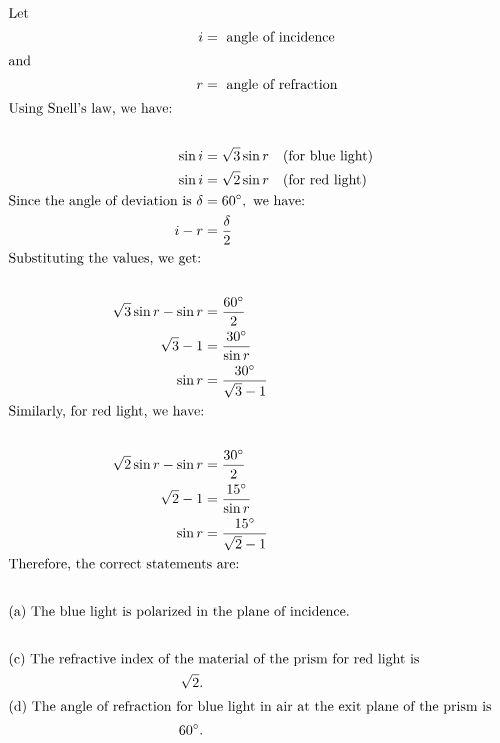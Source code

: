 \begin{solution}
        \begin{align*}
            \intertext{Let } i &= \text{ angle of incidence} \\
            \intertext{and } r &= \text{ angle of refraction} \\
            \intertext{Using Snell's law, we have:} \\
            \sin i &= \sqrt{3} \sin r \quad \text{(for blue light)} \\
            \sin i &= \sqrt{2} \sin r \quad \text{(for red light)} \\
            \text{Since the angle of deviation is } \delta &= 60^\circ, \text{ we have:} \\
            i - r &= \frac{\delta}{2} \\
            \intertext{Substituting the values, we get:} \\
            \sqrt{3} \sin r - \sin r &= \frac{60^\circ}{2} \\
            \sqrt{3} - 1 &= \frac{30^\circ}{\sin r} \\
            \sin r &= \frac{30^\circ}{\sqrt{3} - 1} \\
            \intertext{Similarly, for red light, we have:} \\
            \sqrt{2} \sin r - \sin r &= \frac{30^\circ}{2} \\
            \sqrt{2} - 1 &= \frac{15^\circ}{\sin r} \\
            \sin r &= \frac{15^\circ}{\sqrt{2} - 1} \\
            \intertext{Therefore, the correct statements are:} \\
            \intertext{(a) The blue light is polarized in the plane of incidence.} \\
            \intertext{(c) The refractive index of the material of the prism for red light is } \sqrt{2}. \\
            \intertext{(d) The angle of refraction for blue light in air at the exit plane of the prism is } 60^\circ.
        \end{align*}
    \end{solution}